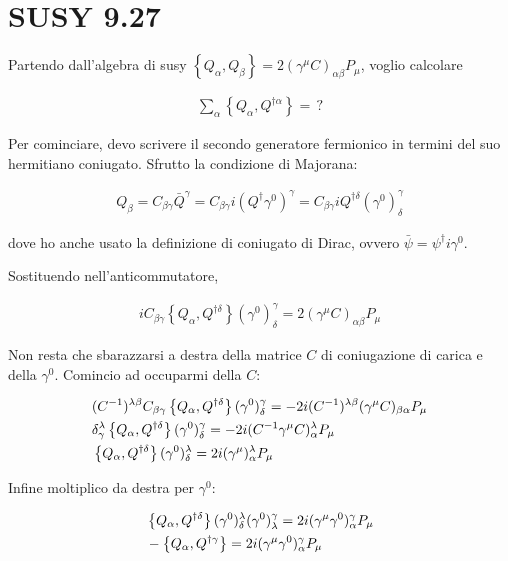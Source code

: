 \documentclass{report}
\begin{document}
\section{SUSY 9.27}

Partendo dall'algebra di susy \(\left\{ Q_\alpha, Q_\beta \right\} = 2(\gamma^\mu C)_{\alpha\beta}P_\mu\), voglio calcolare 

\begin{align}
    \sum_\alpha \left\{ Q_\alpha, Q^{\dagger\alpha} \right\} = \, ? 
\end{align}

Per cominciare, devo scrivere il secondo generatore fermionico in termini del suo hermitiano coniugato. Sfrutto la condizione di Majorana: 

\begin{align}
    Q_\beta = C_{\beta\gamma}\bar{Q}^\gamma = C_{\beta\gamma} i (Q^\dagger \gamma^0)^{\gamma} = C_{\beta\gamma} i Q^{\dagger\delta} (\gamma^0)^\gamma_\delta 
\end{align}

dove ho anche usato la definizione di coniugato di Dirac, ovvero \(\bar{\psi} =  \psi^\dagger i\gamma^0\). 

Sostituendo nell'anticommutatore, 

\begin{align}
    iC_{\beta\gamma}\left\{ Q_\alpha, Q^{\dagger \delta} \right\} (\gamma^0)^\gamma_\delta = 2 (\gamma^\mu C)_{\alpha\beta}P_\mu
\end{align}

Non resta che sbarazzarsi a destra della matrice \(C\) di coniugazione di carica e della \(\gamma^0\). Comincio ad occuparmi della \(C\): 

\begin{align}
    &(C^{-1})^{\lambda\beta}C_{\beta\gamma}\left\{ Q_\alpha, Q^{\dagger \delta} \right\} (\gamma^0)^\gamma_\delta = -2i (C^{-1})^{\lambda\beta} (\gamma^\mu C)_{\beta \alpha}P_\mu \notag \\ 
    &\delta^\lambda_\gamma \left\{ Q_\alpha, Q^{\dagger\delta} \right\}(\gamma^0)^\gamma_\delta = -2i (C^{-1} \gamma^\mu C)^\lambda_\alpha P_\mu \notag \\ 
    &\left\{ Q_\alpha, Q^{\dagger\delta} \right\}(\gamma^0)^\lambda_\delta = 2i (\gamma^\mu)_\alpha^\lambda P_\mu 
\end{align}
 
Infine moltiplico da destra per \(\gamma^0\): 

\begin{align}
    &\left\{ Q_\alpha, Q^{\dagger\delta} \right\}(\gamma^0)^\lambda_\delta(\gamma^0)^\gamma_\lambda = 2i (\gamma^\mu\gamma^0)_\alpha^\gamma P_\mu \notag \\
    &-\left\{ Q_\alpha, Q^{\dagger\gamma} \right\} = 2i (\gamma^\mu\gamma^0)_\alpha^\gamma P_\mu 
\end{align}
\end{document}

